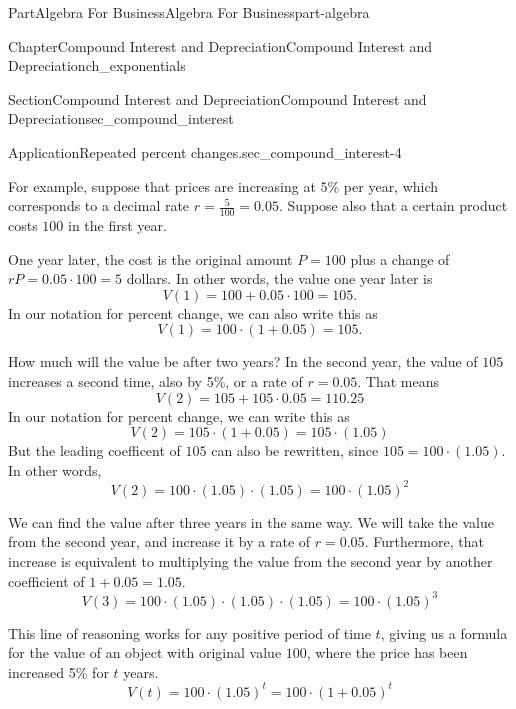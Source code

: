 \documentclass[oneside,10pt,]{tufte-book}
\numberwithin{equation}{chapter}
\begin{document}
\begin{partptx}{Part}{Algebra For Business}{}{Algebra For Business}{}{}{part-algebra}
\begin{chapterptx}{Chapter}{Compound Interest and Depreciation}{}{Compound Interest and Depreciation}{}{}{ch_exponentials}
\begin{sectionptx}{Section}{Compound Interest and Depreciation}{}{Compound Interest and Depreciation}{}{}{sec_compound_interest}
\begin{insight}{Application}{Repeated percent changes.}{sec_compound_interest-4}
\par
For example, suppose that prices are increasing at \(5\)\% per year, which corresponds to a decimal rate \(r = \frac{5}{100}=0.05\). Suppose also that a certain product costs \(100\)\textdollar{} in the first year.%
\par
One year later, the cost is the original amount \(P=100\) plus a change of \(rP = 0.05\cdot 100 = 5\) dollars.  In other words, the value one year later is%
\begin{equation*}
V(1) = 100 + 0.05\cdot 100 = 105.
\end{equation*}
In our notation for percent change, we can also write this as%
\begin{equation*}
V(1) = 100 \cdot (1+0.05) = 105.
\end{equation*}
%
\par
How much will the value be after two years? In the second year, the value of \(105\) increases a second time, also by 5\%, or a rate of \(r=0.05\).  That means%
\begin{equation*}
V(2) = 105 + 105\cdot 0.05 = 110.25
\end{equation*}
In our notation for percent change, we can write this as%
\begin{equation*}
V(2) = 105\cdot (1+0.05) = 105\cdot (1.05)
\end{equation*}
But the leading coefficent of \(105\) can also be rewritten, since \(105 = 100\cdot (1.05)\).  In other words,%
\begin{equation*}
V(2) = 100 \cdot (1.05) \cdot (1.05) = 100\cdot (1.05)^2
\end{equation*}
%
\par
We can find the value after three years in the same way. We will take the value from the second year, and increase it by a rate of \(r=0.05\). Furthermore, that increase is equivalent to multiplying the value from the second year by another coefficient of \(1+0.05=1.05\).%
\begin{equation*}
V(3) = 100 \cdot (1.05)\cdot (1.05)\cdot (1.05) = 100\cdot (1.05)^3
\end{equation*}
%
\par
This line of reasoning works for any positive period of time \(t\), giving us a formula for the value of an object with original value \(100\), where the price has been increased 5\% for \(t\) years.%
\begin{equation*}
V(t) = 100 \cdot (1.05)^t = 100\cdot (1 + 0.05)^t
\end{equation*}
%
\end{insight}

\end{sectionptx}
\end{chapterptx}
\end{partptx}
\end{document}
